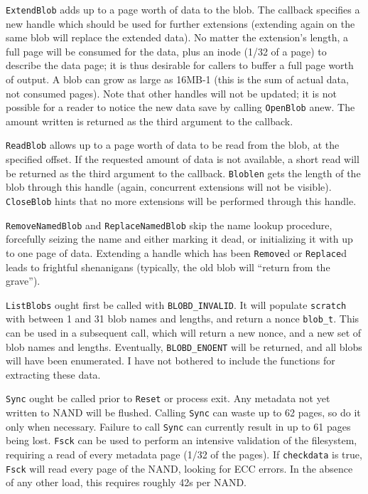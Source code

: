 \documentclass[letterpaper,10pt]{article}
\begin{document}
\texttt{ExtendBlob} adds up to a page worth of data to the blob. The callback
specifies a new handle which should be used for further extensions (extending
again on the same blob will replace the extended data). No matter the extension's
length, a full page will be consumed for the data, plus an inode (1/32 of a page)
to describe the data page; it is thus desirable for callers to buffer a full page
worth of output. A blob can grow as large as 16MB-1 (this is the sum of actual
data, not consumed pages). Note that other handles will not be updated; it is
not possible for a reader to notice the new data save by calling \texttt{OpenBlob}
anew. The amount written is returned as the third argument to the callback.

\texttt{ReadBlob} allows up to a page worth of data to be read from the blob,
at the specified offset. If the requested amount of data is not available, a
short read will be returned as the third argument to the callback. \texttt{Bloblen}
gets the length of the blob through this handle (again, concurrent extensions
will not be visible). \texttt{CloseBlob} hints that no more extensions will
be performed through this handle.

\texttt{RemoveNamedBlob} and \texttt{ReplaceNamedBlob} skip the name lookup
procedure, forcefully seizing the name and either marking it dead, or
initializing it with up to one page of data. Extending a handle which has been
\texttt{Remove}d or \texttt{Replace}d leads to frightful shenanigans (typically,
the old blob will ``return from the grave'').

\texttt{ListBlobs} ought first be called with \texttt{BLOBD\_INVALID}. It will
populate \texttt{scratch} with between 1 and 31 blob names and lengths, and
return a nonce \texttt{blob\_t}. This can be used in a subsequent call, which
will return a new nonce, and a new set of blob names and lengths. Eventually,
\texttt{BLOBD\_ENOENT} will be returned, and all blobs will have been
enumerated. I have not bothered to include the functions for extracting these
data.

\texttt{Sync} ought be called prior to \texttt{Reset} or process exit. Any
metadata not yet written to NAND will be flushed. Calling \texttt{Sync} can
waste up to 62 pages, so do it only when necessary. Failure to call \texttt{Sync}
can currently result in up to 61 pages being lost. \texttt{Fsck} can be used to
perform an intensive validation of the filesystem, requiring a read of every
metadata page (1/32 of the pages). If \texttt{checkdata} is true, \texttt{Fsck}
will read every page of the NAND, looking for ECC errors. In the absence of
any other load, this requires roughly 42s per NAND.
\end{document}
